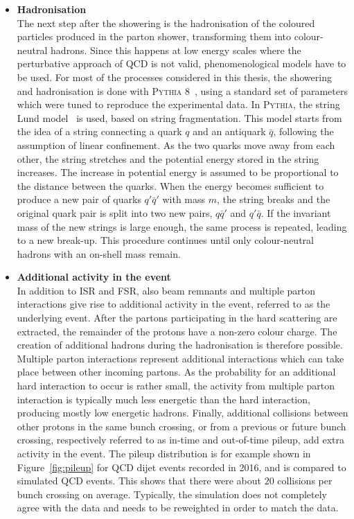 \begin{itemize}
\item[] \textbf{Hadronisation}\\
The next step after the showering is the hadronisation of the coloured particles produced in the parton shower, transforming them into colour-neutral hadrons. Since this happens at low energy scales where the perturbative approach of \acs{QCD} is not valid, phenomenological models have to be used. For most of the processes considered in this thesis, the showering and hadronisation is done with \textsc{Pythia 8}~\cite{Sjostrand:2006za}, using a standard set of parameters which were tuned to reproduce the experimental data. In \textsc{Pythia}, the string Lund model~\cite{Andersson:1983ia} is used, based on string fragmentation. This model starts from the idea of a string connecting a quark $q$ and an antiquark $\bar{q}$, following the assumption of linear confinement. As the two quarks move away from each other, the string stretches and the potential energy stored in the string increases. The increase in potential energy is assumed to be proportional to the distance between the quarks. When the energy becomes sufficient to produce a new pair of quarks $q'\bar{q}'$ with mass $m$, the string breaks and the original quark pair is split into two new pairs, $q\bar{q}'$ and $q'\bar{q}$. If the invariant mass of the new strings is large enough, the same process is repeated, leading to a new break-up. This procedure continues until only colour-neutral hadrons with an on-shell mass remain.

\item[] \textbf{Additional activity in the event}\\
In addition to \ac{ISR} and \ac{FSR}, also beam remnants and multiple parton interactions give rise to additional activity in the event, referred to as the underlying event. After the partons participating in the hard scattering are extracted, the remainder of the protons have a non-zero colour charge. The creation of additional hadrons during the hadronisation is therefore possible. Multiple parton interactions represent additional interactions which can take place between other incoming partons. As the probability for an additional hard interaction to occur is rather small, the activity from multiple parton interaction is typically much less energetic than the hard interaction, producing mostly low energetic hadrons. Finally, additional collisions between other protons in the same bunch crossing, or from a previous or future bunch crossing, respectively referred to as in-time and out-of-time pileup, add extra activity in the event. The pileup distribution is for example shown in Figure~\ref{fig:pileup} for QCD dijet events recorded in 2016, and is compared to simulated QCD events. This shows that there were about $20$ collisions per bunch crossing on average. Typically, the simulation does not completely agree with the data and needs to be reweighted in order to match the data.


\end{itemize}
